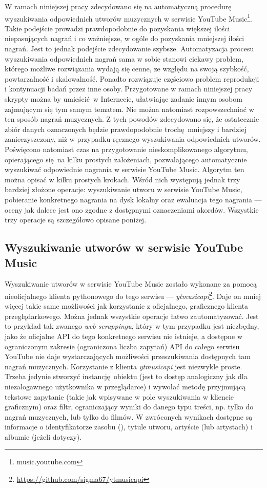 W ramach niniejszej pracy zdecydowano się na automatyczną procedurę wyszukiwania odpowiednich utworów muzycznych w serwisie YouTube Music\footnote{music.youtube.com}. Takie podejście prowadzi prawdopodobnie do pozyskania większej ilości niepasujących nagrań i co ważniejsze, w ogóle do pozyskania mniejszej ilości nagrań. Jest to jednak podejście zdecydowanie szybsze. Automatyzacja procesu wyszukiwania odpowiednich nagrań sama w sobie stanowi ciekawy problem, którego możliwe rozwiązania wydają się cenne, ze względu na swoją szybkość, powtarzalność i skalowalność.  Ponadto rozwiązuje częściowo problem reprodukcji i kontynuacji badań przez inne osoby.  Przygotowane w ramach niniejszej pracy skrypty można by umieścić w Internecie, ułatwiając zadanie innym osobom zajmującym się tym samym tematem. Nie można natomiast rozpowszechniać w ten sposób nagrań muzycznych. Z tych powodów zdecydowano się, że ostatecznie zbiór danych oznaczonych będzie prawdopodobnie trochę mniejszy i bardziej zanieczyszczony, niż w przypadku ręcznego wyszukiwania odpowiednich utworów. Poświęcono natomiast czas na przygotowanie nieskomplikowanego algorytmu, opierającego się na kilku prostych założeniach, pozwalającego automatycznie wyszukiwać odpowiednie nagrania w serwisie YouTube Music. Algorytm ten można opisać w kilku prostych krokach. Wśród nich występują jednak trzy bardziej złożone operacje: wyszukiwanie utworu w serwisie YouTube Music, pobieranie konkretnego nagrania na dysk lokalny oraz ewaluacja tego nagrania --- oceny jak dalece jest ono zgodne z dostępnymi oznaczeniami akordów. Wszystkie trzy operacje są szczegółowo opisane poniżej.

\subsection{Wyszukiwanie utworów w serwisie YouTube Music}

Wyszukiwanie utworów w serwisie YouTube Music zostało wykonane za pomocą nieoficjalnego klienta pythonowego do tego serwisu --- \emph{ytmusicapi}\footnote{\url{https://github.com/sigma67/ytmusicapi}}.  Daje on mniej więcej takie same możliwości jak korzystanie z oficjalnego, graficznego klienta przeglądarkowego. Można jednak wszystkie operacje łatwo zautomatyzować. Jest to przykład tak zwanego \emph{web scrappingu}, który w tym przypadku jest niezbędny, jako że oficjalne API do tego konkretnego serwisu nie istnieje, a dostępne w ograniczonym zakresie (ograniczona liczba zapytań) API do całego serwisu YouTube nie daje wystarczających możliwości przeszukiwania dostępnych tam nagrań muzycznych.  Korzystanie z klienta \emph{ytmusicapi} jest niezwykle proste. Trzeba jedynie stworzyć instancję obiektu  (jest to dostęp analogiczny jak dla niezalogawnego użytkownika w przeglądarce) i wywołać metodę  przyjmującą tekstowe zapytanie (takie jak wpisywane w pole wyszukiwania w kliencie graficznym) oraz filtr, ograniczający wyniki do danego typu treści, np.  tylko do nagrań muzycznych, lub tylko do filmów. W zwróconych wynikach dostępne są informacje o identyfikatorze zasobu (), tytule utworu, artyście (lub artystach) i albumie (jeżeli dotyczy).

